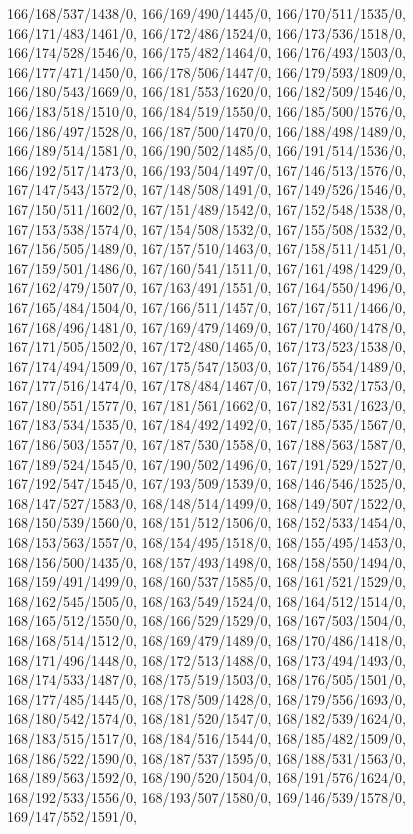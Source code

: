 {166/168/537/1438/0,%
166/169/490/1445/0,%
166/170/511/1535/0,%
166/171/483/1461/0,%
166/172/486/1524/0,%
166/173/536/1518/0,%
166/174/528/1546/0,%
166/175/482/1464/0,%
166/176/493/1503/0,%
166/177/471/1450/0,%
166/178/506/1447/0,%
166/179/593/1809/0,%
166/180/543/1669/0,%
166/181/553/1620/0,%
166/182/509/1546/0,%
166/183/518/1510/0,%
166/184/519/1550/0,%
166/185/500/1576/0,%
166/186/497/1528/0,%
166/187/500/1470/0,%
166/188/498/1489/0,%
166/189/514/1581/0,%
166/190/502/1485/0,%
166/191/514/1536/0,%
166/192/517/1473/0,%
166/193/504/1497/0,%
167/146/513/1576/0,%
167/147/543/1572/0,%
167/148/508/1491/0,%
167/149/526/1546/0,%
167/150/511/1602/0,%
167/151/489/1542/0,%
167/152/548/1538/0,%
167/153/538/1574/0,%
167/154/508/1532/0,%
167/155/508/1532/0,%
167/156/505/1489/0,%
167/157/510/1463/0,%
167/158/511/1451/0,%
167/159/501/1486/0,%
167/160/541/1511/0,%
167/161/498/1429/0,%
167/162/479/1507/0,%
167/163/491/1551/0,%
167/164/550/1496/0,%
167/165/484/1504/0,%
167/166/511/1457/0,%
167/167/511/1466/0,%
167/168/496/1481/0,%
167/169/479/1469/0,%
167/170/460/1478/0,%
167/171/505/1502/0,%
167/172/480/1465/0,%
167/173/523/1538/0,%
167/174/494/1509/0,%
167/175/547/1503/0,%
167/176/554/1489/0,%
167/177/516/1474/0,%
167/178/484/1467/0,%
167/179/532/1753/0,%
167/180/551/1577/0,%
167/181/561/1662/0,%
167/182/531/1623/0,%
167/183/534/1535/0,%
167/184/492/1492/0,%
167/185/535/1567/0,%
167/186/503/1557/0,%
167/187/530/1558/0,%
167/188/563/1587/0,%
167/189/524/1545/0,%
167/190/502/1496/0,%
167/191/529/1527/0,%
167/192/547/1545/0,%
167/193/509/1539/0,%
168/146/546/1525/0,%
168/147/527/1583/0,%
168/148/514/1499/0,%
168/149/507/1522/0,%
168/150/539/1560/0,%
168/151/512/1506/0,%
168/152/533/1454/0,%
168/153/563/1557/0,%
168/154/495/1518/0,%
168/155/495/1453/0,%
168/156/500/1435/0,%
168/157/493/1498/0,%
168/158/550/1494/0,%
168/159/491/1499/0,%
168/160/537/1585/0,%
168/161/521/1529/0,%
168/162/545/1505/0,%
168/163/549/1524/0,%
168/164/512/1514/0,%
168/165/512/1550/0,%
168/166/529/1529/0,%
168/167/503/1504/0,%
168/168/514/1512/0,%
168/169/479/1489/0,%
168/170/486/1418/0,%
168/171/496/1448/0,%
168/172/513/1488/0,%
168/173/494/1493/0,%
168/174/533/1487/0,%
168/175/519/1503/0,%
168/176/505/1501/0,%
168/177/485/1445/0,%
168/178/509/1428/0,%
168/179/556/1693/0,%
168/180/542/1574/0,%
168/181/520/1547/0,%
168/182/539/1624/0,%
168/183/515/1517/0,%
168/184/516/1544/0,%
168/185/482/1509/0,%
168/186/522/1590/0,%
168/187/537/1595/0,%
168/188/531/1563/0,%
168/189/563/1592/0,%
168/190/520/1504/0,%
168/191/576/1624/0,%
168/192/533/1556/0,%
168/193/507/1580/0,%
169/146/539/1578/0,%
169/147/552/1591/0,%
}
